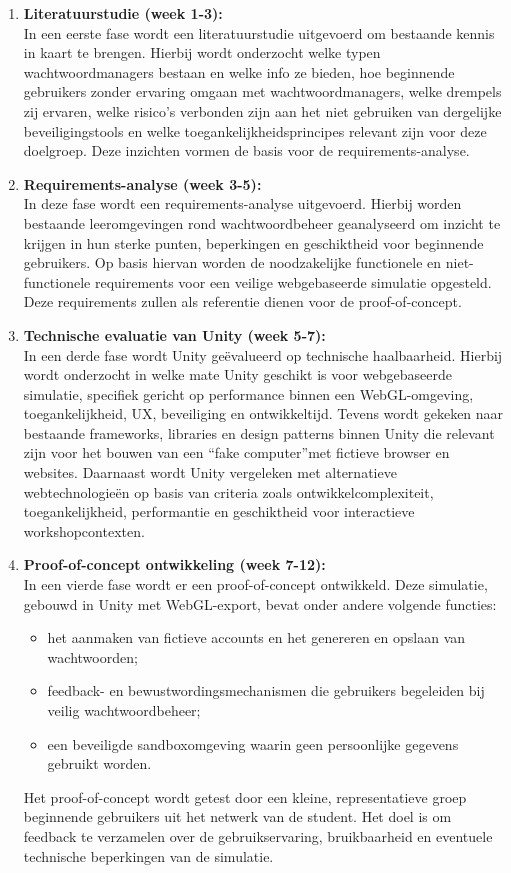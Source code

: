 \begin{enumerate}
    \item \textbf{Literatuurstudie (week 1-3):} \\
    In een eerste fase wordt een literatuurstudie uitgevoerd om bestaande kennis in kaart te brengen. Hierbij wordt onderzocht welke typen wachtwoordmanagers bestaan en welke info ze bieden, hoe beginnende gebruikers zonder ervaring omgaan met wachtwoordmanagers, welke drempels zij ervaren, welke risico's verbonden zijn aan het niet gebruiken van dergelijke beveiligingstools en welke toegankelijkheidsprincipes relevant zijn voor deze doelgroep. Deze inzichten vormen de basis voor de requirements-analyse.
    \item \textbf{Requirements-analyse (week 3-5):} \\
    In deze fase wordt een requirements-analyse uitgevoerd. Hierbij worden bestaande leeromgevingen rond wachtwoordbeheer geanalyseerd om inzicht te krijgen in hun sterke punten, beperkingen en geschiktheid voor beginnende gebruikers. Op basis hiervan worden de noodzakelijke functionele en niet-functionele requirements voor een veilige webgebaseerde simulatie opgesteld. Deze requirements zullen als referentie dienen voor de proof-of-concept.
    \item \textbf{Technische evaluatie van Unity (week 5-7):} \\
    In een derde fase wordt Unity geëvalueerd op technische haalbaarheid. Hierbij wordt onderzocht in welke mate Unity geschikt is voor webgebaseerde simulatie, specifiek gericht op performance binnen een WebGL-omgeving, toegankelijkheid, UX, beveiliging en ontwikkeltijd. Tevens wordt gekeken naar bestaande frameworks, libraries en design patterns binnen Unity die relevant zijn voor het bouwen van een ``fake computer''met fictieve browser en websites. 
    Daarnaast wordt Unity vergeleken met alternatieve webtechnologieën op basis van criteria zoals ontwikkelcomplexiteit, toegankelijkheid, performantie en geschiktheid voor interactieve workshopcontexten.
    \item \textbf{Proof-of-concept ontwikkeling (week 7-12):} \\
    In een vierde fase wordt er een proof-of-concept ontwikkeld. Deze simulatie, gebouwd in Unity met WebGL-export, bevat onder andere volgende functies:
    \begin{itemize}
        \item het aanmaken van fictieve accounts en het genereren en opslaan van wachtwoorden;
        \item feedback- en bewustwordingsmechanismen die gebruikers begeleiden bij veilig wachtwoordbeheer;
        \item een beveiligde sandboxomgeving waarin geen persoonlijke gegevens gebruikt worden.
    \end{itemize} 
    Het proof-of-concept wordt getest door een kleine, representatieve groep beginnende gebruikers uit het netwerk van de student. Het doel is om feedback te verzamelen over de gebruikservaring, bruikbaarheid en eventuele technische beperkingen van de simulatie.
  \end{enumerate}

